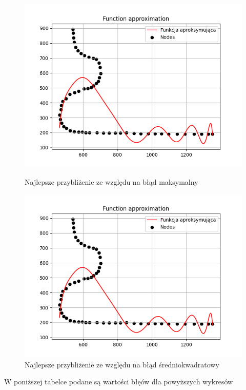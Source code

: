\documentclass{article}
\begin{document}
\begin{figure}[H]
  \begin{minipage}[b]{0.49\textwidth}
    \includegraphics[width=\textwidth]{img.png}
    \caption{Najlepsze przybliżenie ze względu na błąd maksymalny}
  \end{minipage}
  \hfill
  \begin{minipage}[b]{0.49\textwidth}
    \includegraphics[width=\textwidth]{img.png}
    \caption{Najlepsze przybliżenie ze względu na błąd średniokwadratowy}
  \end{minipage}
\end{figure}

\noindent
W poniższej tabelce podane są wartości błęów dla powyższych wykresów
\end{document}
